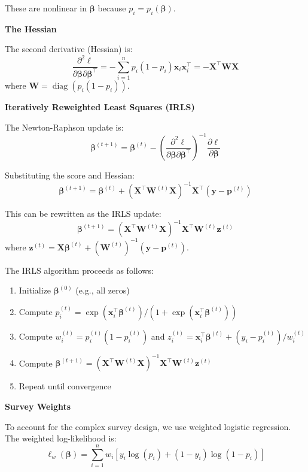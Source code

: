 These are nonlinear in $\boldsymbol{\beta}$ because $p_i = p_i(\boldsymbol{\beta})$.

\textbf{The Hessian}

The second derivative (Hessian) is:
\[
\frac{\partial^2 \ell}{\partial \boldsymbol{\beta} \partial \boldsymbol{\beta}^\top} = -\sum_{i=1}^n p_i(1-p_i) \mathbf{x}_i \mathbf{x}_i^\top = -\mathbf{X}^\top \mathbf{W} \mathbf{X}
\]
where $\mathbf{W} = \operatorname{diag}(p_i(1-p_i))$.

\textbf{Iteratively Reweighted Least Squares (IRLS)}

The Newton-Raphson update is:
\[
\boldsymbol{\beta}^{(t+1)} = \boldsymbol{\beta}^{(t)} - \left(\frac{\partial^2 \ell}{\partial \boldsymbol{\beta} \partial \boldsymbol{\beta}^\top}\right)^{-1} \frac{\partial \ell}{\partial \boldsymbol{\beta}}
\]

Substituting the score and Hessian:
\[
\boldsymbol{\beta}^{(t+1)} = \boldsymbol{\beta}^{(t)} + (\mathbf{X}^\top \mathbf{W}^{(t)} \mathbf{X})^{-1} \mathbf{X}^\top (\mathbf{y} - \mathbf{p}^{(t)})
\]

This can be rewritten as the IRLS update:
\[
\boldsymbol{\beta}^{(t+1)} = (\mathbf{X}^\top \mathbf{W}^{(t)} \mathbf{X})^{-1} \mathbf{X}^\top \mathbf{W}^{(t)} \mathbf{z}^{(t)}
\]
where $\mathbf{z}^{(t)} = \mathbf{X}\boldsymbol{\beta}^{(t)} + (\mathbf{W}^{(t)})^{-1}(\mathbf{y} - \mathbf{p}^{(t)})$.

The IRLS algorithm proceeds as follows:

\begin{enumerate}
	\item Initialize $\boldsymbol{\beta}^{(0)}$ (e.g., all zeros)
	\item Compute $p_i^{(t)} = \exp(\mathbf{x}_i^\top \boldsymbol{\beta}^{(t)}) / (1 + \exp(\mathbf{x}_i^\top \boldsymbol{\beta}^{(t)}))$
	\item Compute $w_i^{(t)} = p_i^{(t)}(1-p_i^{(t)})$ and $z_i^{(t)} = \mathbf{x}_i^\top \boldsymbol{\beta}^{(t)} + (y_i - p_i^{(t)}) / w_i^{(t)}$
	\item Compute $\boldsymbol{\beta}^{(t+1)} = (\mathbf{X}^\top \mathbf{W}^{(t)} \mathbf{X})^{-1} \mathbf{X}^\top \mathbf{W}^{(t)} \mathbf{z}^{(t)}$
	\item Repeat until convergence
\end{enumerate}

\textbf{Survey Weights}

To account for the complex survey design, we use weighted logistic regression. The weighted log-likelihood is:
\[
\ell_w(\boldsymbol{\beta}) = \sum_{i=1}^n w_i \left[ y_i \log(p_i) + (1-y_i) \log(1-p_i) \right]
\]

